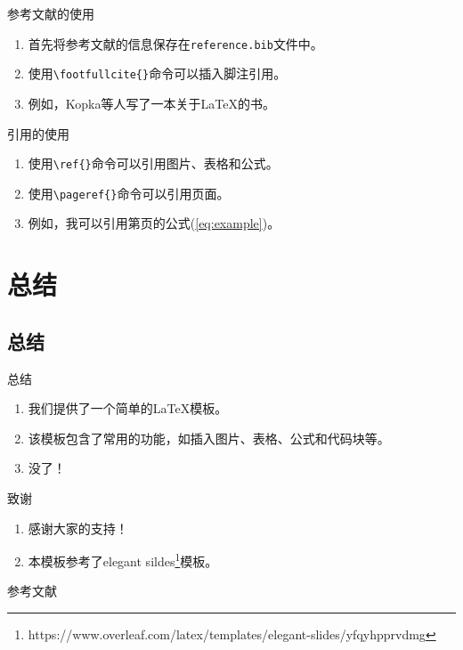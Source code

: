\documentclass[8pt]{ctexbeamer}
\begin{document}
\begin{frame}[fragile]{\insertsection}{\insertsubsection}

    \begin{block}{参考文献的使用}
        \begin{enumerate}
            \item 首先将参考文献的信息保存在\lstinline|reference.bib|文件中。
            \item 使用\lstinline|\footfullcite{}|命令可以插入脚注引用。
            \item 例如，Kopka等人写了一本关于\LaTeX{}的书。
        \end{enumerate}
    \end{block}

    \begin{block}{引用的使用}
        \begin{enumerate}
            \item 使用\lstinline|\ref{}|命令可以引用图片、表格和公式。
            \item 使用\lstinline|\pageref{}|命令可以引用页面。
            \item 例如，我可以引用第\pageref{frame:eq_and_code}页的公式(\ref{eq:example})。
        \end{enumerate}
    \end{block}

\end{frame}

\section{总结}

\subsection{总结}

\makesection

\begin{frame}{\insertsection}{\insertsubsection}
    \begin{block}{总结}
        \begin{enumerate}
            \item 我们提供了一个简单的\LaTeX{}模板。
            \item 该模板包含了常用的功能，如插入图片、表格、公式和代码块等。
            \item 没了！
        \end{enumerate}
    \end{block}

    \begin{block}{致谢}
        \begin{enumerate}
            \item 感谢大家的支持！
            \item 本模板参考了elegant sildes\footnote{https://www.overleaf.com/latex/templates/elegant-slides/yfqyhpprvdmg}模板。
        \end{enumerate}
    \end{block}
\end{frame}

\begin{frame}{参考文献}
    \printbibliography
\end{frame}
\end{document}

